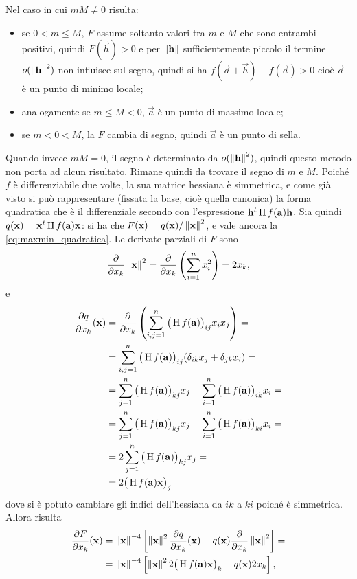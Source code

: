 Nel caso in cui $mM\neq 0$ risulta:
\begin{itemize}
\item se $0<m\leq M$, $F$ assume soltanto valori tra $m$ e $M$ che sono entrambi positivi, quindi $F(\vec h)>0$ e per $\left\|{\mathbf{h}}\right\|$ sufficientemente piccolo il termine $o(\left\|{\mathbf{h}}\right\|^2)$ non influisce sul segno, quindi si ha $f(\vec a+\vec h)-f(\vec a)>0$ cioè $\vec a$ è un punto di minimo locale;
\item analogamente se $m\leq M<0$, $\vec a$ è un punto di massimo locale;
\item se $m<0<M$, la $F$ cambia di segno, quindi $\vec a$ è un punto di sella.
\end{itemize}
Quando invece $mM=0$, il segno è determinato da $o(\left\|{\mathbf{h}}\right\|^2)$, quindi questo metodo non porta ad alcun risultato.
Rimane quindi da trovare il segno di $m$ e $M$. Poiché $f$ è differenziabile due volte, la sua matrice hessiana è simmetrica, e come già visto si può rappresentare (fissata la base, cioè quella canonica) la forma quadratica che è il differenziale secondo con l'espressione $\mathbf{h}^t\operatorname{H} f(\mathbf{a})\mathbf{h}$. Sia quindi $q(\mathbf{x})=\mathbf{x}^t\operatorname{H} f(\mathbf{a})\mathbf{x}$: si ha che $F(\mathbf{x})=q(\mathbf{x})/\left\|{\mathbf{x}}\right\|^2$, e vale ancora la \eqref{eq:maxmin_quadratica}.
Le derivate parziali di $F$ sono
\[
\frac{\partial {}}{\partial {x_k}}\left\|{\mathbf{x}}\right\|^2=\frac{\partial {}}{\partial {x_k}}\left(\sum_{i=1}^nx_i^2\right)=2x_k,
\]
e
\[\begin{split}
\frac{\partial {q}}{\partial {x_k}}(\mathbf{x})	&=\frac{\partial {}}{\partial {x_k}}\left(\sum_{i,j=1}^n\big(\operatorname{H} f(\mathbf{a})\big)_{ij}x_ix_j\right)=\\
					&=\sum_{i,j=1}^n\big(\operatorname{H} f(\mathbf{a})\big)_{ij}(\delta_{ik}x_j+\delta_{jk}x_i)=\\
					&=\sum_{j=1}^n\big(\operatorname{H} f(\mathbf{a})\big)_{kj}x_j+\sum_{i=1}^n\big(\operatorname{H} f(\mathbf{a})\big)_{ik}x_i=\\
					&=\sum_{j=1}^n\big(\operatorname{H} f(\mathbf{a})\big)_{kj}x_j+\sum_{i=1}^n\big(\operatorname{H} f(\mathbf{a})\big)_{ki}x_i=\\
					&=2\sum_{j=1}^n\big(\operatorname{H} f(\mathbf{a})\big)_{kj}x_j=\\
					&=2\big(\operatorname{H} f(\mathbf{a})\mathbf{x}\big)_j
\end{split}\]
dove si è potuto cambiare gli indici dell'hessiana da $ik$ a $ki$ poiché è simmetrica.
Allora risulta
\[\begin{split}
\frac{\partial {F}}{\partial {x_k}}(\mathbf{x})	&=\left\|{\mathbf{x}}\right\|^{-4}\left[\left\|{\mathbf{x}}\right\|^2\frac{\partial {q}}{\partial {x_k}}(\mathbf{x})-q(\mathbf{x})\frac{\partial {}}{\partial {x_k}}\left\|{\mathbf{x}}\right\|^2\right]=\\
					&=\left\|{\mathbf{x}}\right\|^{-4}\left[\left\|{\mathbf{x}}\right\|^22\big(\operatorname{H} f(\mathbf{a})\mathbf{x}\big)_k-q(\mathbf{x})2x_k\right],
\end{split}\]
